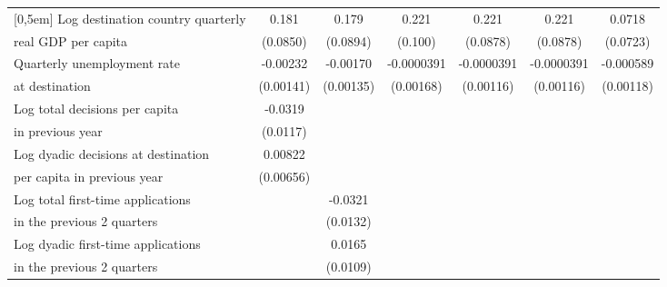 \begin{table}[!ht]
\begin{tabular}{l*{6}{c}}
[0,5em]
Log destination country quarterly &       0.181\sym{*}  &       0.179         &       0.221\sym{*}  &       0.221\sym{*}  &       0.221\sym{*}  &      0.0718         \\
real GDP per capita                    &    (0.0850)         &    (0.0894)         &     (0.100)         &    (0.0878)         &    (0.0878)         &    (0.0723)         \\
[0,5em]
Quarterly unemployment rate &    -0.00232         &    -0.00170         &  -0.0000391         &  -0.0000391         &  -0.0000391         &   -0.000589         \\
at destination                    &   (0.00141)         &   (0.00135)         &   (0.00168)         &   (0.00116)         &   (0.00116)         &   (0.00118)         \\
[0,5em]
Log total decisions per capita &     -0.0319\sym{**} &                     &                     &                     &                     &                     \\
 in previous year                   &    (0.0117)         &                     &                     &                     &                     &                     \\
[0,5em]
Log dyadic decisions at destination  &     0.00822         &                     &                     &                     &                     &                     \\
per capita in previous year                    &   (0.00656)         &                     &                     &                     &                     &                     \\
[0,5em]
Log total first-time applications &                     &     -0.0321\sym{*}  &                     &                     &                     &                     \\
in the previous 2 quarters                    &                     &    (0.0132)         &                     &                     &                     &                     \\
[0,5em]
Log dyadic first-time applications &                     &      0.0165         &                     &                     &                     &                     \\
in the previous 2 quarters                    &                     &    (0.0109)         &                     &                     &                     &                     \\
[0,5em]

\end{tabular}
\end{table}
